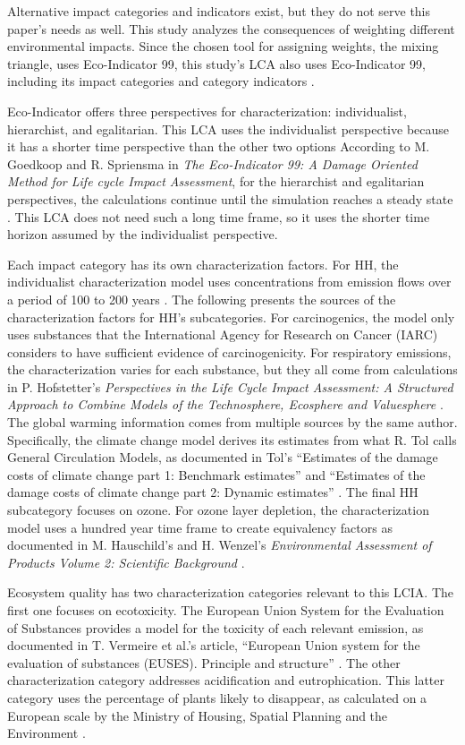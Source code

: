 \documentclass[final,journal,10pt,letterpaper,oneside,twocolumn,compsoc]%
{IEEEtran}
\begin{document}
Alternative impact categories and indicators exist, but they do not serve this
paper's needs as well. This study analyzes the consequences of weighting
different environmental
impacts. Since the chosen tool for assigning weights, the mixing triangle, uses
Eco-Indicator 99, this study's LCA also uses Eco-Indicator 99, including its
impact categories and category indicators \cite{triangle} \cite{pre}.

Eco-Indicator offers three perspectives for characterization: individualist,
hierarchist, and egalitarian. This LCA uses
the individualist perspective because it has a shorter time
perspective than the other two options
According to M. Goedkoop and R. Spriensma in
\textit{The Eco-Indicator 99: A Damage Oriented Method for Life cycle Impact
Assessment}, for the hierarchist and egalitarian
perspectives, the calculations continue until the simulation reaches a steady
state \cite{pre-annex}. This LCA does not need such a long time frame, so it
uses the shorter time horizon assumed by the individualist perspective.

Each impact category has its own characterization factors. For HH, the individualist
characterization model uses concentrations from emission flows
over a period of 100 to 200 years \cite{pre-annex}. The following presents the
sources of the characterization factors for HH's subcategories. For
carcinogenics, the model only uses
substances that the International Agency for Research on Cancer (IARC) considers
to have sufficient evidence of carcinogenicity. For respiratory emissions, the
characterization varies for each substance, but they all come from calculations
in P. Hofstetter's
\textit{Perspectives in the Life Cycle Impact Assessment: A Structured Approach
to Combine Models of the Technosphere, Ecosphere and Valuesphere} \cite{lcia}.
The global warming information comes from multiple sources by the same author.
Specifically, the climate change model derives its estimates from what R. Tol
calls General Circulation Models, as documented in Tol's
``Estimates of the damage costs of climate change part 1: Benchmark estimates''
and ``Estimates of the damage costs of climate change part 2: Dynamic
estimates'' \cite{climate1}
\cite{climate2}. The final HH subcategory focuses on ozone.
For ozone
layer depletion, the characterization model uses a
hundred year time frame to create equivalency factors as documented in
M. Hauschild's and H. Wenzel's \textit{Environmental Assessment of Products
Volume 2: Scientific Background} \cite{ozone}.

Ecosystem quality has two characterization categories relevant to this LCIA. The
first one focuses on ecotoxicity. The European Union System for the Evaluation
of Substances provides a model for the toxicity of each relevant emission, as
documented in T. Vermeire et al.'s article, ``European Union system for the
evaluation of substances (EUSES). Principle and structure''
\cite{euses}. The other characterization category addresses acidification and
eutrophication. This
latter category uses the percentage of plants likely to disappear, as calculated
on
a
European scale by the Ministry of Housing, Spatial Planning and the Environment
\cite{pre}.
\end{document}
